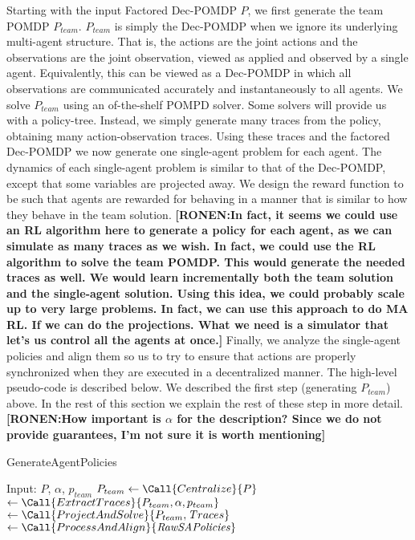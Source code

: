 \documentclass[letterpaper]{article} %
\newcommand{\eliran}[1]{\textbf{[\color{red}ELIRAN:#1]}}
\newcommand{\ronen}[1]{\textbf{[\color{blue}RONEN:#1]}}
\begin{document}
Starting with the input Factored Dec-POMDP $P$, we first generate the team POMDP $P_{team}$. $P_{team}$ is simply the Dec-POMDP when we
ignore its underlying multi-agent structure. That is, the actions are the joint actions and the observations are the joint observation, viewed as applied 
and observed by a single agent. Equivalently, this can be viewed as a Dec-POMDP in which all observations are communicated accurately and instantaneously 
to all agents. We solve $P_{team}$ using an of-the-shelf POMPD solver. Some solvers will provide us with a policy-tree. Instead, we simply 
generate many traces from the policy, obtaining many action-observation traces. Using these traces and the factored Dec-POMDP we now generate
one single-agent problem for each agent. The dynamics of each single-agent problem is similar to that of the Dec-POMDP, except that some variables
are projected away. We design the reward function to be such that agents are rewarded for behaving in a manner that is similar to how they behave
in the team solution. 
\ronen{In fact, it seems we could use an RL algorithm here to generate a policy for each agent, as we can simulate as many traces as we wish.
In fact, we could use the RL algorithm to solve the team POMDP. This would generate the needed traces as well. We would learn incrementally
both the team solution and the single-agent solution. Using this idea, we could probably scale up to very large problems. In fact, we can use this
approach to do MA RL. If we can do the projections. What we need is a simulator that let's us control all the agents at once.}
Finally, we analyze the single-agent policies and align them so us to try to ensure that actions are properly synchronized  when they are
executed in a decentralized manner. The high-level pseudo-code is described below. We described the first step (generating $P_{team}$)
above. In the rest of this section we explain the rest of these step in more detail.
\ronen{How important is $\alpha$ for the description? Since we do not provide guarantees, I'm not sure it is worth mentioning}

\begin{algorithm}
\caption{GenerateAgentPolicies}
\begin{algorithmic}[tbph]
\State Input: $P$, $\alpha$, $p_{team}$
\State $P_{team} \gets \Call{Centralize}{P}$
 $\gets \Call{ExtractTraces}{P_{team}, \alpha, p_{team}}$
$ \gets \Call{ProjectAndSolve}{P_{team},{\mathit Traces}}$
 $\gets \Call{ProcessAndAlign}{\mathit{RawSAPolicies}}$
\end{algorithmic}
\end{algorithm}
\end{document}
